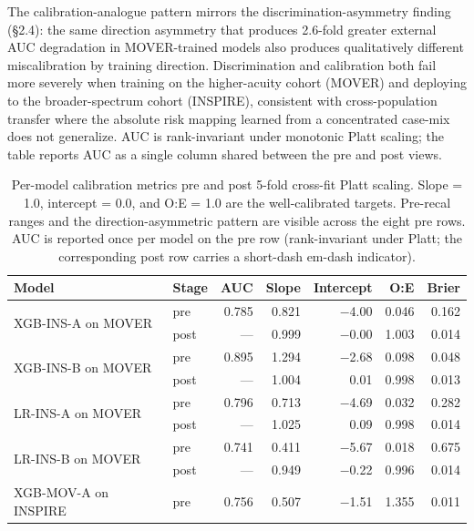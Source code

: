 \documentclass[11pt,a4paper]{article}
\begin{document}
The calibration-analogue pattern mirrors the discrimination-asymmetry
finding (\S2.4): the same direction asymmetry that produces 2.6-fold
greater external AUC degradation in MOVER-trained models also produces
qualitatively different miscalibration by training direction. Discrimination
and calibration both fail more severely when training on the higher-acuity
cohort (MOVER) and deploying to the broader-spectrum cohort (INSPIRE),
consistent with cross-population transfer where the absolute risk mapping
learned from a concentrated case-mix does not generalize. AUC is
rank-invariant under monotonic Platt scaling; the table reports AUC as a
single column shared between the pre and post views.

\begin{table}[H]
\centering
\caption{Per-model calibration metrics pre and post 5-fold cross-fit Platt
scaling. Slope = 1.0, intercept = 0.0, and O:E = 1.0 are the well-calibrated
targets. Pre-recal ranges and the direction-asymmetric pattern are visible
across the eight pre rows. AUC is reported once per model on the pre row
(rank-invariant under Platt; the corresponding post row carries a
short-dash em-dash indicator).}
\label{tab:s5-platt-summary}
\setlength{\tabcolsep}{4pt}
\small
\begin{tabular}{llrrrrr}
\toprule
\textbf{Model} & \textbf{Stage} & \textbf{AUC} & \textbf{Slope} & \textbf{Intercept} & \textbf{O:E} & \textbf{Brier} \\
\midrule
\multirow{2}{*}{XGB-INS-A on MOVER}
  & pre  & 0.785 & 0.821 & $-$4.00 & 0.046 & 0.162 \\
  & post & ---   & 0.999 & $-$0.00 & 1.003 & 0.014 \\
\cmidrule(l){2-7}
\multirow{2}{*}{XGB-INS-B on MOVER}
  & pre  & 0.895 & 1.294 & $-$2.68 & 0.098 & 0.048 \\
  & post & ---   & 1.004 &  0.01   & 0.998 & 0.013 \\
\cmidrule(l){2-7}
\multirow{2}{*}{LR-INS-A on MOVER}
  & pre  & 0.796 & 0.713 & $-$4.69 & 0.032 & 0.282 \\
  & post & ---   & 1.025 &  0.09   & 0.998 & 0.014 \\
\cmidrule(l){2-7}
\multirow{2}{*}{LR-INS-B on MOVER}
  & pre  & 0.741 & 0.411 & $-$5.67 & 0.018 & 0.675 \\
  & post & ---   & 0.949 & $-$0.22 & 0.996 & 0.014 \\
\midrule
\multirow{2}{*}{XGB-MOV-A on INSPIRE}
  & pre  & 0.756 & 0.507 & $-$1.51 & 1.355 & 0.011 \\

\end{tabular}
\end{table}
\end{document}
